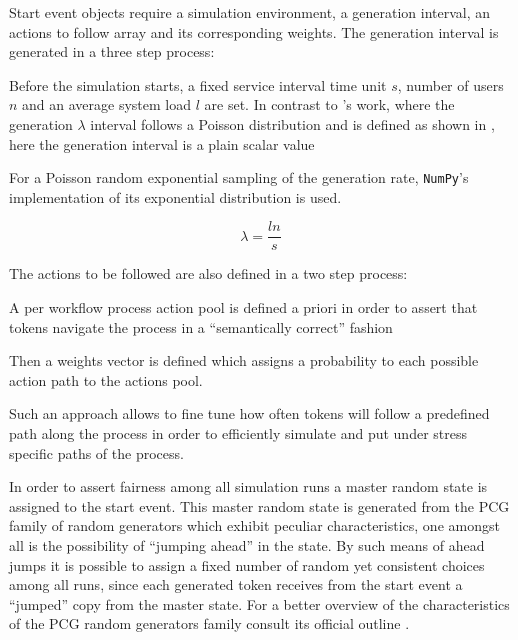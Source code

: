 \documentclass[draft=false]{seal_thesis}
\begin{document}
Start event objects require a simulation environment, a generation interval, an actions to follow array and its corresponding weights. The generation interval is generated in a three step process:
\begin{enumerate*}
 	\item Before the simulation starts, a fixed service interval time unit $s$, number of users $n$ and an average system load $l$ are set. In contrast to \citet{Zeng2005}'s work, where the generation $\lambda$ interval follows a Poisson distribution and is defined as shown in , here the generation interval is a plain scalar value
 	\item For a Poisson random exponential sampling of the generation rate, \texttt{NumPy}'s implementation of its exponential distribution is used.
 \end{enumerate*}

\begin{equation}
\label{eq:generation_interval}
	\lambda = \frac{l n}{s}
\end{equation}

The actions to be followed are also defined in a two step process:
\begin{enumerate*}
	\item A per workflow process action pool is defined a priori in order to assert that tokens navigate the process in a ``semantically correct'' fashion
	\item Then a weights vector is defined which assigns a probability to each possible action path to the actions pool.
\end{enumerate*}

Such an approach allows to fine tune how often tokens will follow a predefined path along the process in order to efficiently simulate and put under stress specific paths of the process.

In order to assert fairness among all simulation runs a master random state is assigned to the start event. This master random state is generated from the PCG family of random generators which exhibit peculiar characteristics, one amongst all is the possibility of ``jumping ahead'' in the state. By such means of ahead jumps it is possible to assign a fixed number of random yet consistent choices among all runs, since each generated token receives from the start event a ``jumped'' copy from the master state. For a better overview of the characteristics of the PCG random generators family consult its official outline .
\end{document}
